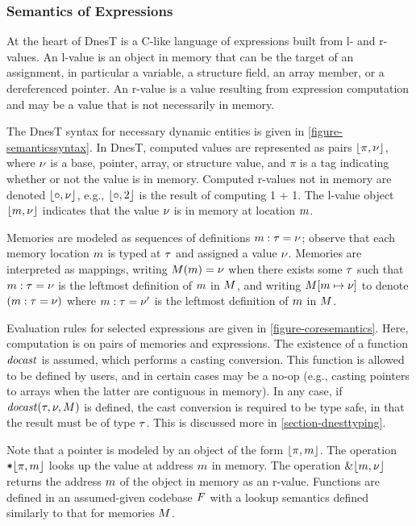 \semanticssyntaxfig

\subsubsection{Semantics of Expressions}

At the heart of DnesT is a C-like language of expressions built from l- and r-values. An l-value
is an object in memory that can be the target of an assignment, in particular a variable, a
structure field, an array member, or a dereferenced pointer. An r-value is a value resulting
from expression computation and may be a value that is not necessarily in memory.

The DnesT syntax for necessary dynamic entities is given in \autoref{figure-semanticssyntax}. In
DnesT, computed values are represented as pairs $\lfloor \pi,{\nu} \rfloor$, where ${\nu}$ is a base,
pointer, array, or structure value, and $\pi$ is a tag indicating whether or not the value is in
memory. Computed r-values not in memory are denoted $\lfloor \circ,{\nu} \rfloor$, e.g., $\lfloor \circ,2 \rfloor$
is the result of computing 1 + 1. The l-value object $\lfloor m,{\nu} \rfloor$ indicates that the value
${\nu}$ is in memory at location $m$.

Memories are modeled as sequences of definitions $m : \tau = {\nu}$; observe that each memory
location $m$ is typed at $\tau$ and assigned a value ${\nu}$. Memories are interpreted as
mappings, writing $M(m) = {\nu}$ when there exists some $\tau$ such that $m : \tau = {\nu}$
is the leftmost definition of $m$ in $M$, and writing $M[m \mapsto {\nu}]$ to
denote $(m : \tau = {\nu})$ where $m : \tau = {\nu}'$ is the leftmost definition of $m$ in
$M$.

Evaluation rules for selected expressions are given in \autoref{figure-coresemantics}. Here,
computation is on pairs of memories and expressions. The existence of a function
$\mathit{docast}$ is assumed, which performs a casting conversion. This function is allowed to
be defined by users, and in certain cases may be a no-op (e.g., casting pointers to arrays when
the latter are contiguous in memory). In any case, if $\mathit{docast}(\tau,{\nu},M)$ is defined,
the cast conversion is required to be type safe, in that the result must be of type $\tau$. This
is discussed more in \autoref{section-dnesttyping}.

\coresemanticsfig

Note that a pointer is modeled by an object of the form $\lfloor \pi,m \rfloor$. The operation
$\texttt{*}\lfloor \pi,m \rfloor$ looks up the value at address $m$ in memory. The operation
$\&\lfloor m,{\nu} \rfloor$ returns the address $m$ of the object in memory as an r-value. Functions
are defined in an assumed-given codebase $F$ with a lookup semantics defined similarly to
that for memories $M$.

